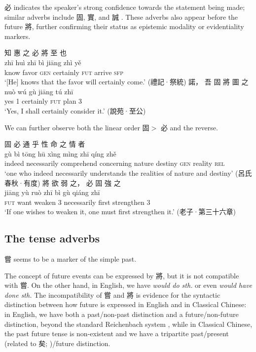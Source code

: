 \documentclass[UTF8, a4paper, oneside, scheme=plain, 12pt]{ctexrep}
\newcommand*{\textgt}{$>$ }
\newcommand*{\citepages}[1]{pp.~{#1}}
\newcommand{\form}[1]{\emph{#1}}
\newcommand{\translate}[1]{`#1'}
\newcommand*{\category}[1]{\textsc{#1}}
\begin{document}
必 indicates the speaker's strong confidence towards the statement being made;
similar adverbs include 固, 實, and 誠
\citep[\citepages{376-377}]{li2004grammar}.
These adverbs also appear before the future 將,
further confirming their status as epistemic modality or evidentiality markers.

\begin{exe}
    \ex
    \glll 知 惠 之 必 將 至 也 \\
    zhī huì zhī bì jiāng zhì yě \\
    know favor \category{gen} certainly \category{fut} arrive \category{sfp} \\
    \glt\translate{[He] knows that the favor will certainly come.} \hfill (禮記·祭統)
    \ex
    \glll 諾， 吾 固 將 圖 之 \\
    nuò wú gù jiāng tú zhī \\
    yes 1 certainly \category{fut} plan 3 \\
    \glt\translate{Yes, I shall certainly consider it.} \hfill (說苑·至公)
\end{exe}

We can further observe both the linear order 固\textgt 必 and the reverse.

\begin{exe}
    \ex
    \glll 固 必 通 乎 性 命 之 情 者 \\
    gù bì tōng hū xìng mìng zhī qíng zhě \\
    indeed necessarily comprehend concerning nature destiny \category{gen} reality \category{rel} \\
    \glt\translate{one who indeed necessarily understands the realities of nature and destiny} \hfill (呂氏春秋·有度)
    \ex
    \glll 將 欲 弱 之， 必 固 強 之 \\
    jiāng yù ruò zhī bì gù qiáng zhī \\
    \category{fut} want weaken 3 necessarily first strengthen 3 \\
    \glt\translate{If one wishes to weaken it, one must first strengthen it.} \hfill (老子·第三十六章)
\end{exe}

\subsection{The tense adverbs}\label{sec:tam.adverbs.tense}

嘗 seems to be a marker of the simple past.

The concept of future events can be expressed by 將,
but it is not compatible with 嘗.
On the other hand, in English, we have \form{would do sth.} or even \form{would have done sth.}
The incompatibility of 嘗 and 將 is evidence for the syntactic distinction between how future is expressed in English and in Classical Chinese:
in English, we have both a past/non-past distinction and a future/non-future distinction, beyond the standard Reichenbach system \citep{vikner1985reichenbach},
while in Classical Chinese, the past future tense is non-existent and we have a tripartite past/present (related to 矣; )/future distinction.
\end{document}
